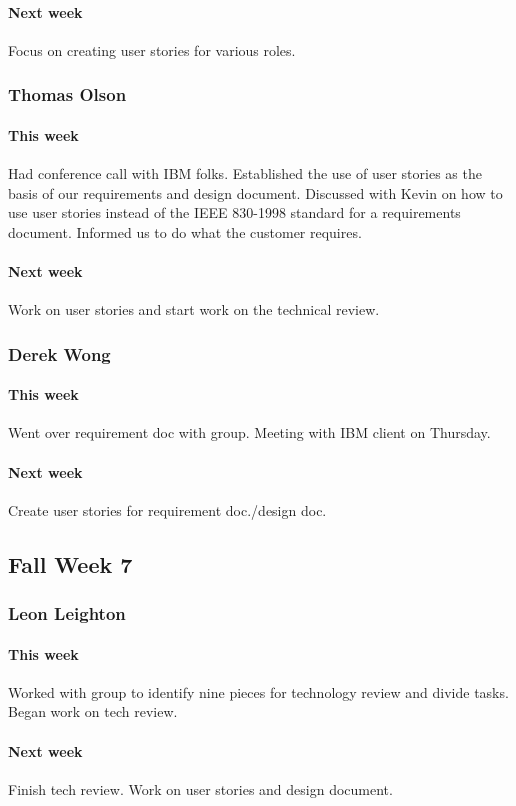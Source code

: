\documentclass[10pt,letterpaper,onecolumn,draftclsnofoot]{IEEEtran}
\begin{document}
\paragraph{Next week} Focus on creating user stories for various roles.
\subsubsection{Thomas Olson}
\paragraph{This week}Had conference call with IBM folks. Established the use of user stories as the basis of our requirements and design document. Discussed with Kevin on how to use user stories instead of the IEEE 830-1998 standard for a requirements document. Informed us to do what the customer requires.
\paragraph{Next week}Work on user stories and start work on the technical review.
\subsubsection{Derek Wong}
\paragraph{This week}Went over requirement doc with group. Meeting with IBM client on Thursday.
\paragraph{Next week}Create user stories for requirement doc./design doc.

\subsection{Fall Week 7}
\subsubsection{Leon Leighton}
\paragraph{This week}Worked with group to identify nine pieces for technology review and divide tasks. Began work on tech review.
\paragraph{Next week}Finish tech review. Work on user stories and design document.
\end{document}

